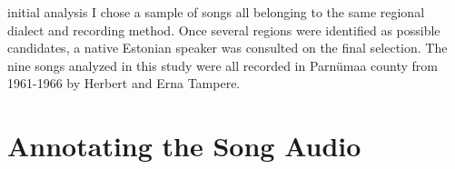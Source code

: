  initial analysis I chose a sample of songs all belonging to the same regional dialect and recording method. Once several regions were identified as possible candidates, a native Estonian speaker was consulted on the final selection. The nine songs analyzed in this study were all recorded in Parnümaa county from 1961-1966 by Herbert and Erna Tampere. 


\section{Annotating the Song Audio }

